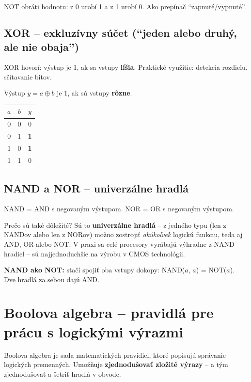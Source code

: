 NOT obráti hodnotu: z 0 urobí 1 a z 1 urobí 0. Ako prepínač ``zapnuté/vypnuté''.

\subsection{XOR -- exkluzívny súčet (``jeden alebo druhý, ale nie obaja'')}

XOR hovorí: výstup je 1, ak sa vstupy \textbf{líšia}. Praktické využitie: detekcia rozdielu, sčítavanie bitov.

\begin{minipage}{0.52\textwidth}
Výstup $y = a \oplus b$ je 1, ak sú vstupy \textbf{rôzne}.
\end{minipage}
\hfill
\begin{minipage}{0.44\textwidth}
\begin{center}
\begin{tabular}{cc|c}
\toprule
$a$ & $b$ & $y$ \\
\midrule
0 & 0 & 0 \\
0 & 1 & \textbf{1} \\
1 & 0 & \textbf{1} \\
1 & 1 & 0 \\
\bottomrule
\end{tabular}
\end{center}
\end{minipage}

\subsection{NAND a NOR -- univerzálne hradlá}

NAND = AND s negovaným výstupom. NOR = OR s negovaným výstupom.

Prečo sú také dôležité? Sú to \textbf{univerzálne hradlá} -- z jedného typu (len z NANDov alebo len z NORov) možno zostrojiť \textit{akúkoľvek} logickú funkciu, teda aj AND, OR alebo NOT. V praxi sa celé procesory vyrábajú výhradne z NAND hradiel -- sú najjednoduchšie na výrobu v CMOS technológii.

\textbf{NAND ako NOT:} stačí spojiť oba vstupy dokopy: NAND($a$, $a$) = NOT($a$). Dve hradlá za sebou dajú AND.

\section{Boolova algebra -- pravidlá pre prácu s logickými výrazmi}

Boolova algebra je sada matematických pravidiel, ktoré popisujú správanie logických premenných. Umožňuje \textbf{zjednodušovať zložité výrazy} -- a tým zjednodušovať a šetriť hradlá v obvode.

